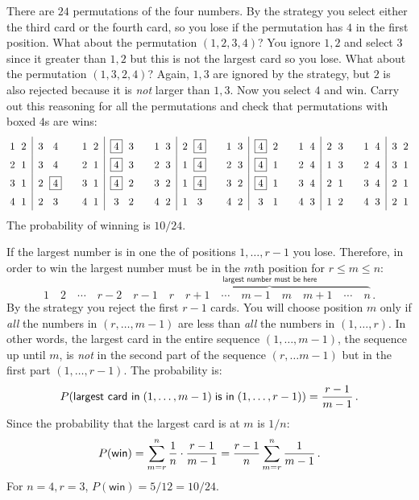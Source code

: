 There are $24$ permutations of the four numbers. By the strategy you select either the third card or the fourth card, so you lose if the  permutation has $4$ in the first position. What about the permutation $(1,2,3,4)$? You ignore $1,2$ and select $3$ since it  greater than $1,2$ but this is not the largest card so you lose. What about the permutation $(1,3,2,4)$? Again, $1,3$ are ignored by the strategy, but $2$ is also rejected because it is \emph{not} larger than $1,3$. Now you select $4$ and win. Carry out this reasoning for all the permutations and check that permutations with boxed $4$s are wins:
\[
\addtolength{\arraycolsep}{-2pt}
\renewcommand*{\arraystretch}{1.5}
\begin{array}{cc|cc@{\hspace{2em}}cc|cc@{\hspace{2em}}cc|cc@{\hspace{2em}}cc|cc@{\hspace{2em}}cc|cc@{\hspace{2em}}cc|cc}
1&2\;&\;3&4&
1&2\;&\;\fbox{4}&3&
1&3\;&\;2&\fbox{4}&
1&3\;&\;\fbox{4}&2&
1&4\;&\;2&3&
1&4\;&\;3&2\\
2&1\;&\;3&4&
2&1\;&\;\fbox{4}&3&
2&3\;&\;1&\fbox{4}&
2&3\;&\;\fbox{4}&1&
2&4\;&\;1&3&
2&4\;&\;3&1\\
3&1\;&\;2&\fbox{4}&
3&1\;&\;\fbox{4}&2&
3&2\;&\;1&\fbox{4}&
3&2\;&\;\fbox{4}&1&
3&4\;&\;2&1&
3&4\;&\;2&1\\
4&1\;&\;2&3&
4&1\;&\;3&2&
4&2\;&\;1&3&
4&2\;&\;3&1&
4&3\;&\;1&2&
4&3\;&\;2&1
\end{array}
\]
The probability of winning is $10/24$.

 If the largest number is in one the of positions $1,\ldots,r-1$ you lose. Therefore, in order to win the largest number must be in the $m$th position for $r\leq m\leq n$:
\[
1\quad 2\quad \cdots\quad r-2 \quad r-1 \quad \overbrace{r \quad r+1 \quad \cdots\quad m-1\quad  m \quad m+1\quad \cdots \quad n}^{\textsf{largest number must be here}}\,.
\]
By the strategy you reject the first $r-1$ cards. You will choose position $m$ only if \emph{all} the numbers in $(r,\ldots,m-1)$ are less than \emph{all} the numbers in $(1,\ldots,r)$. In other words, the largest card in the entire sequence $(1,\ldots,m-1)$, the sequence up until $m$, is \emph{not} in the second part of the sequence $(r,\ldots m-1)$ but in the first part $(1,\ldots,r-1)$. The probability is:
\[
P(\textsf{largest card in}\;(1,\ldots,m-1)\;\textsf{is in}\; (1,\ldots,r-1)) = \displaystyle\frac{r-1}{m-1}\,.
\]
Since the probability that the largest card is at $m$ is $1/n$:
\begin{equation}\label{eq.dowry1}
P(\textsf{win}) = \sum_{m=r}^{n} \displaystyle\frac{1}{n} \cdot \displaystyle\frac{r-1}{m-1}= \displaystyle\frac{r-1}{n}\sum_{m=r}^{n} \displaystyle\frac{1}{m-1}\,.
\end{equation}
For $n=4, r=3$, $P(\textsf{win}) = 5/12=10/24$.

